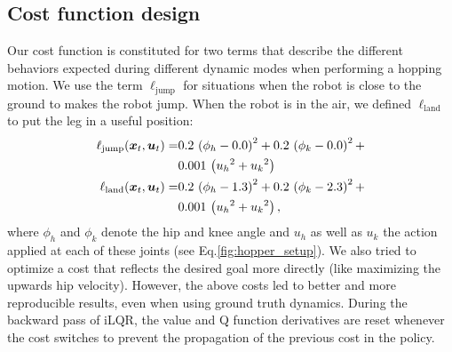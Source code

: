 \subsection{Cost function design}
Our cost function is constituted for two terms that describe
the different behaviors expected during different dynamic modes when performing a hopping motion.
We use the term $\ell_\textrm{jump}$ for situations when the robot is close to the ground to makes the robot jump. When the robot is in the air, we defined $\ell_\textrm{land}$ to put the leg in a useful position:
%
\begin{align}
    \label{eq:cost_hopper_jump}
    \ell_\textrm{jump}(\bm{x}_{t}, \bm{u}_{t}) = &
          0.2\, \left({\phi_h} - 0.0\right)^2 + 0.2\, \left({\phi_k} - 0.0\right)^2 +\\&  0.001\, \left({u_h}^2 + {u_k}^2\right) \nonumber \\
    \ell_\textrm{land}(\bm{x}_{t}, \bm{u}_{t}) = &
        0.2\,\left({\phi_h} - 1.3\right)^2 + 0.2\, \left({\phi_k} - 2.3\right)^2 + \\ & 0.001\, \left({u_h}^2 + {u_k}^2\right), \nonumber
\end{align}
%
where $\phi_h$ and $\phi_k$ denote the hip and knee angle and $u_h$ as well as $u_k$ the action applied at each of these joints (see Eq.\eqref{fig:hopper_setup}). We also tried to optimize a cost that reflects the desired goal more directly (like maximizing the upwards hip velocity). However, the above costs led to better and more reproducible results, even when using
ground truth dynamics.
%
During the backward pass of iLQR, the value and Q function derivatives are reset whenever the cost switches
to prevent the propagation of the previous cost in the policy.
%
%
